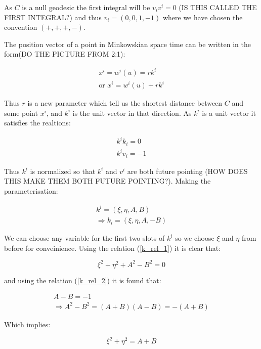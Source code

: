 \noindent As $C$ is a null geodesic the first integral will be $v_i v^i = 0$ (IS THIS CALLED THE FIRST INTEGRAL?) and thus $v_i = (0,0,1,-1)$ where we have chosen the convention $(+,+,+,-)$. 

The position vector of a point in Minkowskian space time can be written in the form(DO THE PICTURE FROM 2:1):

\begin{eqnarray*}
x^i = w^i (u) = r k^i \\
\text{or } x^i = w^i(u) + r k^i 
\end{eqnarray*}

\noindent Thus $r$ is a new parameter which tell us the shortest distance between $C$ and some point $x^i$, and $k^i$ is the unit vector in that direction. As $k^i$ is a unit vector it satisfies the realtions:

\begin{eqnarray}
k^i k_i = 0 \label{k_rel_1}\\
k^i v_i = -1 \label{k_rel_2}
\end{eqnarray}

\noindent Thus $k^i$ is normalized so that $k^i$ and $v^i$ are both future pointing (HOW DOES THIS MAKE THEM BOTH FUTURE POINTING?). Making the parameterisation:

\begin{eqnarray*}
k^i = (\xi, \eta, A, B) \\
\Rightarrow k_i = (\xi, \eta, A, -B)
\end{eqnarray*}

\noindent We can choose any variable for the first two slots of $k^i$ so we choose $\xi$ and $\eta$ from before for conveinience. Using the relation (\ref{k_rel_1}) it is clear that:

\begin{equation*}
\xi^2 + \eta^2 + A^2 - B^2 = 0
\end{equation*}

\noindent and using the relation (\ref{k_rel_2}) it is found that:

\begin{eqnarray}
A - B = -1 \label{sim_rel_1}\\
\Rightarrow A^2 - B^2 = (A + B)(A - B) = - (A + B)
\end{eqnarray}


\noindent Which implies:

\begin{equation}\label{sim_rel_2}
\xi^2 + \eta^2 = A + B 
\end{equation}

